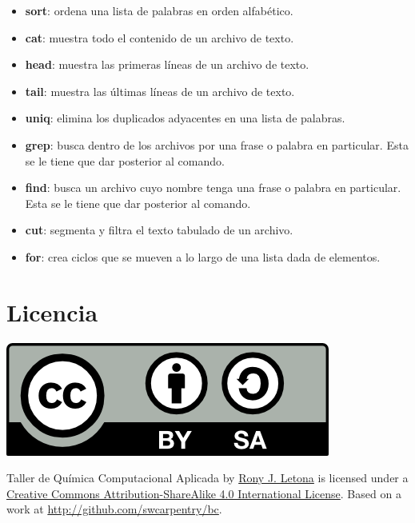 \documentclass[10pt,letterpaper]{article}
\begin{document}
\begin{small}
\begin{itemize}
\item \textbf{sort}: ordena una lista de palabras en orden alfab\'etico.
\item \textbf{cat}: muestra todo el contenido de un archivo de texto.
\item \textbf{head}: muestra las primeras l\'ineas de un archivo de texto.
\item \textbf{tail}: muestra las \'ultimas l\'ineas de un archivo de texto.
\item \textbf{uniq}: elimina los duplicados adyacentes en una lista de palabras.
\item \textbf{grep}: busca dentro de los archivos por una frase o palabra en particular. Esta se le tiene que dar posterior al comando.
\item \textbf{find}: busca un archivo cuyo nombre tenga una frase o palabra en particular. Esta se le tiene que dar posterior al comando.
\item \textbf{cut}: segmenta y filtra el texto tabulado de un archivo.
\item \textbf{for}: crea ciclos que se mueven a lo largo de una lista dada de elementos.
\end{itemize}
\end{small}

\section*{Licencia}

\noindent \includegraphics{img/cc_big.png}

\noindent Taller de Qu\'imica Computacional Aplicada by \href{http://github.com/zronyj/TQCA}{Rony J. Letona} is licensed under a \href{http://creativecommons.org/licenses/by-sa/4.0/}{Creative Commons Attribution-ShareAlike 4.0 International License}.
Based on a work at \url{http://github.com/swcarpentry/bc}.
\end{document}
